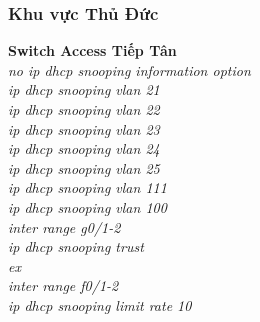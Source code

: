\documentclass[a4paper, 12pt]{article}
\begin{document}
\subsubsection{Khu vực Thủ Đức}
\hspace*{1cm}\textbf{Switch Access Tiếp Tân}\\
\hspace*{2cm}\textit{no ip dhcp snooping information option\\
\hspace*{2cm}ip dhcp snooping vlan 21\\
\hspace*{2cm}ip dhcp snooping vlan 22\\
\hspace*{2cm}ip dhcp snooping vlan 23\\
\hspace*{2cm}ip dhcp snooping vlan 24\\
\hspace*{2cm}ip dhcp snooping vlan 25\\
\hspace*{2cm}ip dhcp snooping vlan 111\\
\hspace*{2cm}ip dhcp snooping vlan 100\\
\hspace*{2cm}inter range g0/1-2\\
\hspace*{2cm}ip dhcp snooping trust\\
\hspace*{2cm}ex\\
\hspace*{2cm}inter range f0/1-2\\
\hspace*{2cm}ip dhcp snooping limit rate 10\\}
\end{document}
